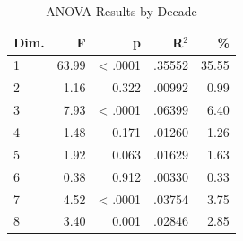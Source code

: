 \begin{table}[H]
  \centering
  \caption{ANOVA Results by Decade}
  \label{tab:anova_decade}
  \begin{tabular}{l r r r r}
    Dim. & F & p & R$^2$ & \% \\
    \hline
    1 & 63.99 & < .0001 & .35552 & 35.55 \\
    2 & 1.16 & 0.322 & .00992 & 0.99 \\
    3 & 7.93 & < .0001 & .06399 & 6.40 \\
    4 & 1.48 & 0.171 & .01260 & 1.26 \\
    5 & 1.92 & 0.063 & .01629 & 1.63 \\
    6 & 0.38 & 0.912 & .00330 & 0.33 \\
    7 & 4.52 & < .0001 & .03754 & 3.75 \\
    8 & 3.40 & 0.001 & .02846 & 2.85 \\
  \end{tabular}
\end{table}
